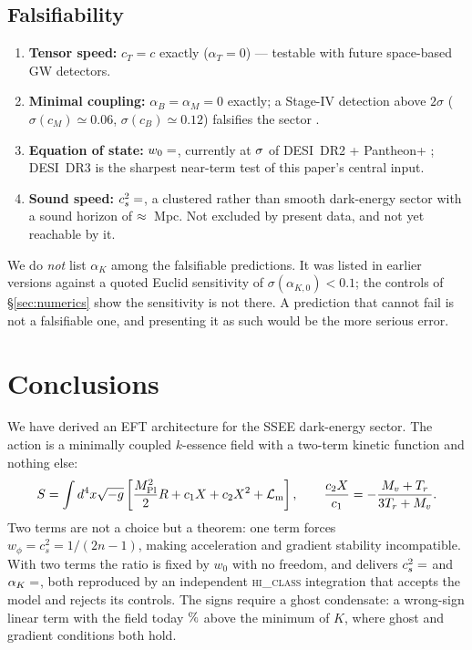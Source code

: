 \documentclass[12pt,a4paper]{article}
\newcommand{\Mpl}{M_{\mathrm{Pl}}}
\begin{document}
\subsection{Falsifiability}

\begin{enumerate}
  \item \textbf{Tensor speed:} $c_T = c$ exactly ($\alpha_T = 0$) —
    testable with future space-based GW detectors.
  \item \textbf{Minimal coupling:} $\alpha_B = \alpha_M = 0$ exactly; a
    Stage-IV detection above $2\sigma$ ($\sigma(c_M)\simeq0.06$,
    $\sigma(c_B)\simeq0.12$) falsifies the sector \citep{alonso2017}.
  \item \textbf{Equation of state:} $w_0 = \val{W0_d6}$, currently at
    $\val{p2_w0wa_ssee_ec26}\sigma$ of DESI~DR2 + Pantheon+ \citep{desidr2_2025}; DESI~DR3
    is the sharpest near-term test of this paper's central input.
  \item \textbf{Sound speed:} $c_s^2 = \val{cs2_condensado_d6}$, a clustered rather than
    smooth dark-energy sector with a sound horizon of $\approx \val{horizonte_cs_d0}$~Mpc.
    Not excluded by present data, and not yet reachable by it.
\end{enumerate}

We do \emph{not} list $\alpha_K$ among the falsifiable predictions.  It
was listed in earlier versions against a quoted Euclid sensitivity of
$\sigma(\alpha_{K,0}) < 0.1$; the controls of §\ref{sec:numerics} show
the sensitivity is not there.  A prediction that cannot fail is not a
falsifiable one, and presenting it as such would be the more serious
error.
\section{Conclusions}
\label{sec:conclusions}

We have derived an EFT architecture for the SSEE dark-energy sector.  The
action is a minimally coupled $k$-essence field with a two-term kinetic
function and nothing else:
%
\begin{equation*}
  S = \int d^4x\sqrt{-g}\left[\frac{\Mpl^2}{2}R
      + c_1 X + c_2 X^2
      + \mathcal{L}_{\rm m}
  \right],
  \qquad \frac{c_2 X}{c_1} = -\frac{M_v+T_r}{3T_r+M_v}.
\end{equation*}
%
Two terms are not a choice but a theorem: one term forces
$w_\phi = c_s^2 = 1/(2n-1)$, making acceleration and gradient stability
incompatible.  With two terms the ratio is fixed by $w_0$ with no
freedom, and delivers $c_s^2 = \val{cs2_condensado_d6}$ and $\alpha_K = \val{alpha_K_z0_d6}$, both
reproduced by an independent \textsc{hi\_class} integration that accepts
the model and rejects its controls.  The signs require a ghost
condensate: a wrong-sign linear term with the field today $\val{p7_Xbg_pct}\%$
above the minimum of $K$, where ghost and gradient conditions both hold.
\end{document}
